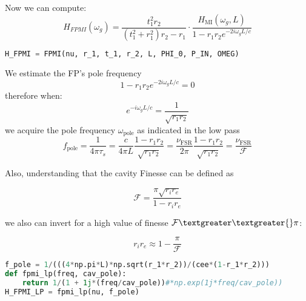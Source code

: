 \noindent Now we can compute:
\begin{equation} H_{FPMI}(\omega_g) =  \frac{t_1^2r_2}{(t_1^2 + r_1^2)r_2 -r_1}\cdot \frac{H_{\mathrm{MI}}(\omega_g, L)}{1-r_1r_2e^{-2i \omega_g L /c }}  \end{equation}

\begin{spacing}{1.2} \begin{lstlisting}[frame=single, language=Python]
H_FPMI = FPMI(nu, r_1, t_1, r_2, L, PHI_0, P_IN, OMEG)
\end{lstlisting} \end{spacing}

\noindent We estimate the FP's pole frequency
\begin{equation}  1 - r_1 r_2 e^{-2i \omega_g L / c} = 0 \end{equation} therefore when:
\begin{equation} e^{-i \omega_g L / c} = \frac{1}{\sqrt{r_1 r_2}} \end{equation} we acquire the
pole frequency \(\omega_\mathrm{pole}\) as indicated in the low pass
\begin{equation} f_\mathrm{pole} = \frac{1}{4\pi \tau_{s}} =  \frac{c}{4 \pi L} \frac{1- r_1 r_2}{\sqrt{r_1 r_2}} = \frac{\nu_\mathrm{FSR}}{2 \pi} \frac{1- r_1 r_2}{\sqrt{r_1 r_2}} = \frac{\nu_\mathrm{FSR}}{\mathcal{F}} \end{equation}

\noindent Also, understanding that the cavity Finesse can be defined as

\begin{equation} \mathcal{F} = \frac{\pi \sqrt{r_i r_e}}{1- r_i r_e} \end{equation}

\noindent we also can invert for a high value of finesse $ \mathcal{F} \textgreater\textgreater{} \pi $:

\begin{equation} r_i r_e \approx 1 - \frac{\pi}{\mathcal{F}} \end{equation}

\begin{spacing}{1.2} \begin{lstlisting}[frame=single, language=Python]
f_pole = 1/(((4*np.pi*L)*np.sqrt(r_1*r_2))/(cee*(1-r_1*r_2)))
def fpmi_lp(freq, cav_pole):
    return 1/(1 + 1j*(freq/cav_pole))#*np.exp(1j*freq/cav_pole))
H_FPMI_LP = fpmi_lp(nu, f_pole)
\end{lstlisting} \end{spacing}

